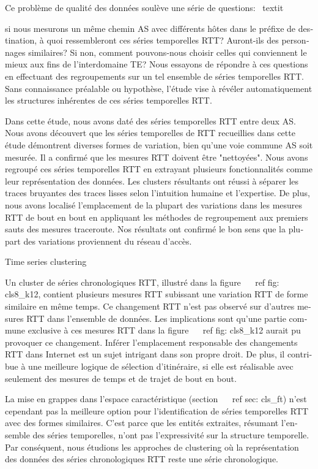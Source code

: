 \begin{otherlanguage}{french}
Ce problème de qualité des données soulève une série de questions: \ textit {si nous mesurons un même chemin AS avec différents hôtes dans le préfixe de destination, à quoi ressembleront ces séries temporelles RTT? Auront-ils des personnages similaires? Si non, comment pouvons-nous choisir celles qui conviennent le mieux aux fins de l'interdomaine TE?
Nous essayons de répondre à ces questions en effectuant des regroupements sur un tel ensemble de séries temporelles RTT.
Sans connaissance préalable ou hypothèse, l'étude vise à révéler automatiquement les structures inhérentes de ces séries temporelles RTT.

Dans cette étude, nous avons daté des séries temporelles RTT entre deux AS.
Nous avons découvert que les séries temporelles de RTT recueillies dans cette étude démontrent diverses formes de variation, bien qu'une voie commune AS soit mesurée.
Il a confirmé que les mesures RTT doivent être "nettoyées".
Nous avons regroupé ces séries temporelles RTT en extrayant%
plusieurs fonctionnalités comme leur représentation des données.
Les clusters résultants ont réussi à séparer les traces bruyantes des traces lisses selon l'intuition humaine et l'expertise.
De plus, nous avons localisé l'emplacement de la plupart des variations dans les mesures RTT de bout en bout en appliquant les méthodes de regroupement aux premiers sauts des mesures traceroute.
Nos résultats ont confirmé le bon sens que la plupart des variations proviennent du réseau d'accès.

Time series clustering

Un cluster de séries chronologiques RTT, illustré dans la figure ~ \ ref {fig: cls8_k12}, contient plusieurs mesures RTT subissant une variation RTT de forme similaire en même temps.
Ce changement RTT n'est pas observé sur d'autres mesures RTT dans l'ensemble de données.
Les implications sont qu'une partie commune exclusive à ces mesures RTT dans la figure ~ \ ref {fig: cls8_k12} aurait pu provoquer ce changement.
Inférer l'emplacement responsable des changements RTT dans Internet est un sujet intrigant dans son propre droit.
De plus, il contribue à une meilleure logique de sélection d'itinéraire, si elle est réalisable avec seulement des mesures de temps et de trajet de bout en bout.

La mise en grappes dans l'espace caractéristique (section ~ \ ref {sec: cls_ft}) n'est cependant pas la meilleure option pour l'identification de séries temporelles RTT avec des formes similaires.
C'est parce que les entités extraites, résumant l'ensemble des séries temporelles, n'ont pas l'expressivité sur la structure temporelle.
Par conséquent, nous étudions les approches de clustering où la représentation des données des séries chronologiques RTT reste une série chronologique.

}
\end{otherlanguage}
